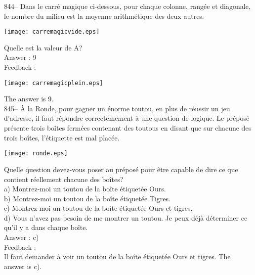 \documentclass[letterpaper, 12pt]{article}
\begin{document}
844-- Dans le carr\'e magique ci-dessous, pour chaque colonne, rang\'ee et
diagonale, le nombre du milieu est la moyenne arithm\'etique des deux
autres.    \begin{center}
    \texttt{[image: carremagicvide.eps]}
    \end{center}
Quelle est la valeur de A?\\

Answer : 9\\

Feedback : \\

    \begin{center}
    \texttt{[image: carremagicplein.eps]}
    \end{center}


The answer is 9.\\

845-- \`A la Ronde, pour gagner un \'enorme toutou, en plus de
r\'eussir un jeu d'adresse, il faut r\'epondre correctemement \`a
une question de logique.  Le pr\'epos\'e pr\'esente trois bo\^ites
ferm\'ees contenant des toutous en disant que sur chacune des trois
bo\^ites, l'\'etiquette est mal plac\'ee.
    \begin{center}
    \texttt{[image: ronde.eps]}
    \end{center}
Quelle question devez-vous poser au pr\'epos\'e pour \^etre capable de dire
ce que contient r\'eellement chacune des bo\^ites?\\
a) Montrez-moi un toutou de la bo\^ite \'etiquet\'ee \og Ours\fg .\\
b) Montrez-moi un toutou de la bo\^ite \'etiquet\'ee \og Tigres\fg .\\
c) Montrez-moi un toutou de la bo\^ite \'etiquet\'ee \og Ours et tigres\fg.\\
d) Vous n'avez pas besoin de me montrer un toutou.  Je peux d\'ej\`a
d\'eterminer ce qu'il y a dans chaque bo\^ite.\\

Answer : c)\\

Feedback : \\
Il faut demander \`a voir un toutou de la bo\^ite \'etiquet\'ee \og
Ours et tigres\fg.  The answer is c).\\
\end{document}
